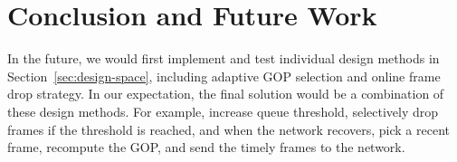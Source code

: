 \section{Conclusion and Future Work}
In the future, we would first implement and test individual design methods in Section~\ref{sec:design-space}, including adaptive GOP selection and online frame drop strategy. In our expectation, the final solution would be a combination of these design methods. For example, increase queue threshold, selectively drop frames if the threshold is reached, and when the network recovers, pick a recent frame, recompute the GOP, and send the timely frames to the network. 